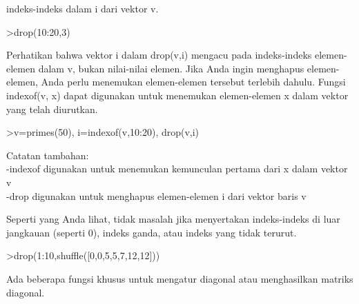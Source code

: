 \documentclass[a4paper,10pt]{article}
\begin{document}
\begin{eulernotebook}
\begin{eulercomment}
\begin{eulercomment}
\begin{eulercomment}
\begin{eulercomment}
\begin{eulercomment}
indeks-indeks dalam i dari vektor v.
\end{eulercomment}
\begin{eulerprompt}
>drop(10:20,3)
\end{eulerprompt}
\begin{euleroutput}
  [10,  11,  13,  14,  15,  16,  17,  18,  19,  20]
\end{euleroutput}
\begin{eulercomment}
Perhatikan bahwa vektor i dalam drop(v,i) mengacu pada indeks-indeks
elemen-elemen dalam v, bukan nilai-nilai elemen. Jika Anda ingin
menghapus elemen-elemen, Anda perlu menemukan elemen-elemen tersebut
terlebih dahulu. Fungsi indexof(v, x) dapat digunakan untuk menemukan
elemen-elemen x dalam vektor yang telah diurutkan.
\end{eulercomment}
\begin{eulerprompt}
>v=primes(50), i=indexof(v,10:20), drop(v,i)
\end{eulerprompt}
\begin{euleroutput}
  [2,  3,  5,  7,  11,  13,  17,  19,  23,  29,  31,  37,  41,  43,  47]
  [0,  5,  0,  6,  0,  0,  0,  7,  0,  8,  0]
  [2,  3,  5,  7,  23,  29,  31,  37,  41,  43,  47]
\end{euleroutput}
\begin{eulercomment}
Catatan tambahan:\\
-indexof digunakan untuk menemukan kemunculan pertama dari x dalam
vektor v\\
-drop digunakan untuk menghapus elemen-elemen i dari vektor baris v

Seperti yang Anda lihat, tidak masalah jika menyertakan indeks-indeks
di luar jangkauan (seperti 0), indeks ganda, atau indeks yang tidak
terurut.
\end{eulercomment}
\begin{eulerprompt}
>drop(1:10,shuffle([0,0,5,5,7,12,12]))
\end{eulerprompt}
\begin{euleroutput}
  [1,  2,  3,  4,  6,  8,  9,  10]
\end{euleroutput}
\begin{eulercomment}
Ada beberapa fungsi khusus untuk mengatur diagonal atau menghasilkan
matriks diagonal.


\end{eulercomment}
\end{eulercomment}
\end{eulercomment}
\end{eulercomment}
\end{eulercomment}
\end{eulernotebook}
\end{document}
